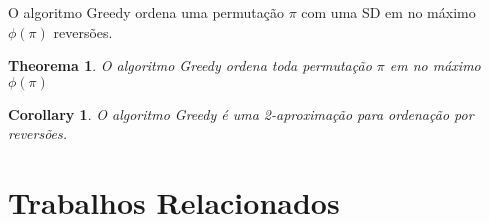 \begin{lema}
O algoritmo Greedy ordena uma permutação $\pi$ com uma SD em no máximo $\phi(\pi)$ reversões.
 
\end{lema}
\newtheorem{theorema}{Theorema}
\begin{theorema}
O algoritmo Greedy ordena toda permutação $\pi$ em no máximo $\phi(\pi)$
\end{theorema}


\newtheorem{corollary}{Corollary}
\begin{corollary}
O algoritmo Greedy é uma 2-aproximação para ordenação por reversões.
\end{corollary}



\section{Trabalhos Relacionados}







